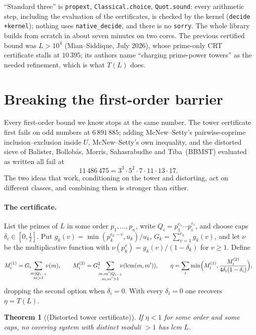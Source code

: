 \documentclass[11pt]{article}
\newtheorem{theorem}{Theorem}
\theoremstyle{definition}
\theoremstyle{remark}
\newcommand{\lcm}{\operatorname{lcm}}
\newcommand{\moniker}[1]{\textup{(#1)}}
\newcommand{\lean}[1]{\texttt{#1}}
\begin{document}
\noindent ``Standard three'' is \lean{propext}, \lean{Classical.choice}, \lean{Quot.sound}: every arithmetic step, including the evaluation of the certificates, is checked by the kernel (\lean{decide +kernel}); nothing uses \lean{native\_decide}, and there is no \lean{sorry}. The whole library builds from scratch in about seven minutes on two cores. The previous certified bound was $L > 10^4$ (Mian--Siddique, July 2026), whose prime-only CRT certificate stalls at $10\,395$; its authors name ``charging prime-power towers'' as the needed refinement, which is what $T(L)$ does.

\section{Breaking the first-order barrier}\label{sec:hybrid}

Every first-order bound we know stops at the same number. The tower certificate first fails on odd numbers at $6\,891\,885$; adding McNew--Setty's pairwise-coprime inclusion--exclusion inside $U$, McNew--Setty's own inequality, and the distorted sieve of Balister, Bollob\'as, Morris, Sahasrabudhe and Tiba~(BBMST) evaluated as written all fail at
\[
11\,486\,475 = 3^3\cdot 5^2\cdot 7\cdot 11\cdot 13\cdot 17 .
\]
The two ideas that work, conditioning on the tower and distorting, act on different classes, and combining them is stronger than either.

\paragraph{The certificate.} List the primes of $L$ in some order $p_1, \dots, p_n$, write $Q_i = p_1^{e_1}\cdots p_i^{e_i}$, and choose caps $\delta_i \in [0,\tfrac12]$. Put $g_k(v) = \min(p_k^{e_k - v}, u_k)/u_k$, $G_k = \sum_{v=1}^{e_k} g_k(v)$, and let $\nu$ be the multiplicative function with $\nu(p_k^v) = g_k(v)/(1-\delta_k)$ for $v \ge 1$. Define
\[
M^{(1)}_i = G_i\!\!\sum_{\substack{m \mid Q_{i-1}\\ m > 1}}\!\!\nu(m), \qquad
M^{(2)}_i = G_i^2\!\!\!\sum_{\substack{m, m' \mid Q_{i-1}\\ m, m' > 1}}\!\!\!\nu(\lcm(m,m')), \qquad
\eta = \sum_i \min\Bigl(M^{(1)}_i, \frac{M^{(2)}_i}{4\delta_i(1-\delta_i)}\Bigr),
\]
dropping the second option when $\delta_i = 0$. With every $\delta_i = 0$ one recovers $\eta = T(L)$.

\begin{theorem}[\moniker{Distorted tower certificate}]\label{thm:hybrid}
If $\eta < 1$ for some order and some caps, no covering system with distinct moduli $> 1$ has lcm $L$.
\end{theorem}
\end{document}
